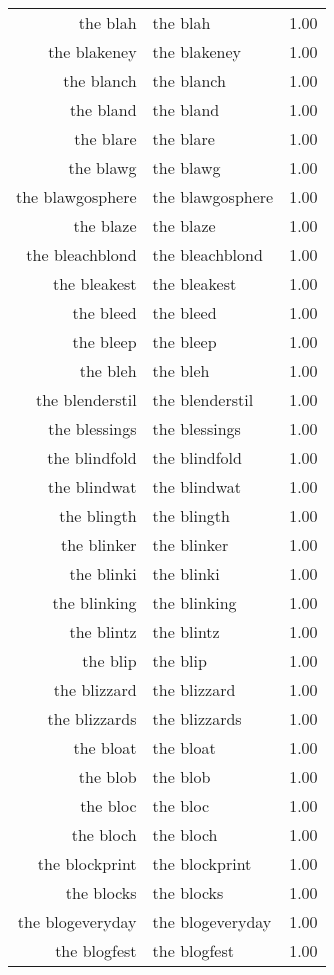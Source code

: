 \begin{table}[ht]
\begin{tabular}{rlr}
  the blah & the blah & 1.00 \\ 
  the blakeney & the blakeney & 1.00 \\ 
  the blanch & the blanch & 1.00 \\ 
  the bland & the bland & 1.00 \\ 
  the blare & the blare & 1.00 \\ 
  the blawg & the blawg & 1.00 \\ 
  the blawgosphere & the blawgosphere & 1.00 \\ 
  the blaze & the blaze & 1.00 \\ 
  the bleachblond & the bleachblond & 1.00 \\ 
  the bleakest & the bleakest & 1.00 \\ 
  the bleed & the bleed & 1.00 \\ 
  the bleep & the bleep & 1.00 \\ 
  the bleh & the bleh & 1.00 \\ 
  the blenderstil & the blenderstil & 1.00 \\ 
  the blessings & the blessings & 1.00 \\ 
  the blindfold & the blindfold & 1.00 \\ 
  the blindwat & the blindwat & 1.00 \\ 
  the blingth & the blingth & 1.00 \\ 
  the blinker & the blinker & 1.00 \\ 
  the blinki & the blinki & 1.00 \\ 
  the blinking & the blinking & 1.00 \\ 
  the blintz & the blintz & 1.00 \\ 
  the blip & the blip & 1.00 \\ 
  the blizzard & the blizzard & 1.00 \\ 
  the blizzards & the blizzards & 1.00 \\ 
  the bloat & the bloat & 1.00 \\ 
  the blob & the blob & 1.00 \\ 
  the bloc & the bloc & 1.00 \\ 
  the bloch & the bloch & 1.00 \\ 
  the blockprint & the blockprint & 1.00 \\ 
  the blocks & the blocks & 1.00 \\ 
  the blogeveryday & the blogeveryday & 1.00 \\ 
  the blogfest & the blogfest & 1.00 \\ 

\end{tabular}
\end{table}
